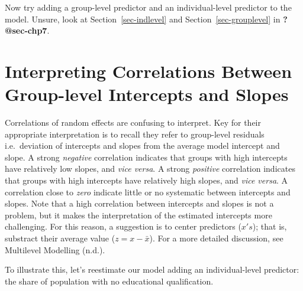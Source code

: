 \documentclass[
  letterpaper,
  krantz2]{style/krantz}
\newenvironment{Shaded}{\begin{snugshade}}{\end{snugshade}}
\newcommand{\AttributeTok}[1]{\textcolor[rgb]{0.40,0.45,0.13}{#1}}
\newcommand{\CommentTok}[1]{\textcolor[rgb]{0.37,0.37,0.37}{#1}}
\newcommand{\DecValTok}[1]{\textcolor[rgb]{0.68,0.00,0.00}{#1}}
\newcommand{\FunctionTok}[1]{\textcolor[rgb]{0.28,0.35,0.67}{#1}}
\newcommand{\NormalTok}[1]{\textcolor[rgb]{0.00,0.23,0.31}{#1}}
\newcommand{\OtherTok}[1]{\textcolor[rgb]{0.00,0.23,0.31}{#1}}
\newcommand{\SpecialCharTok}[1]{\textcolor[rgb]{0.37,0.37,0.37}{#1}}
\begin{document}
Now try adding a group-level predictor and an individual-level predictor
to the model. Unsure, look at Section~\ref{sec-indlevel} and
Section~\ref{sec-grouplevel} in \textbf{?@sec-chp7}.

\hypertarget{interpreting-correlations-between-group-level-intercepts-and-slopes}{%
\section{Interpreting Correlations Between Group-level Intercepts and
Slopes}\label{interpreting-correlations-between-group-level-intercepts-and-slopes}}

Correlations of random effects are confusing to interpret. Key for their
appropriate interpretation is to recall they refer to group-level
residuals i.e.~deviation of intercepts and slopes from the average model
intercept and slope. A strong \emph{negative} correlation indicates that
groups with high intercepts have relatively low slopes, and \emph{vice
versa}. A strong \emph{positive} correlation indicates that groups with
high intercepts have relatively high slopes, and \emph{vice versa}. A
correlation close to \emph{zero} indicate little or no systematic
between intercepts and slopes. Note that a high correlation between
intercepts and slopes is not a problem, but it makes the interpretation
of the estimated intercepts more challenging. For this reason, a
suggestion is to center predictors (\(x's\)); that is, substract their
average value (\(z = x - \bar{x}\)). For a more detailed discussion, see
Multilevel Modelling (n.d.).

To illustrate this, let's reestimate our model adding an
individual-level predictor: the share of population with no educational
qualification.

\begin{Shaded}
\end{Shaded}
\end{document}
